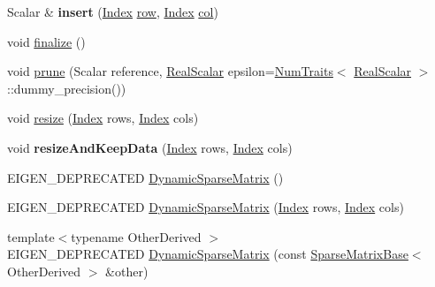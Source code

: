 \begin{DoxyCompactItemize}
\item 
\mbox{\label{class_eigen_1_1_dynamic_sparse_matrix_a4b80127847b5114a9386315f9eca74ed}} 
Scalar \& {\bfseries insert} (\hyperlink{group___core___module_a554f30542cc2316add4b1ea0a492ff02}{Index} \hyperlink{group___sparse_core___module_ac0a5563ed3f243f013fb9d2c17e230d0}{row}, \hyperlink{group___core___module_a554f30542cc2316add4b1ea0a492ff02}{Index} \hyperlink{group___sparse_core___module_a8f4eaa3c3921ef3823ffc69ebcc356af}{col})
\item 
void \hyperlink{class_eigen_1_1_dynamic_sparse_matrix_aa0abc0e4565143f103f0d7373bd4a125}{finalize} ()
\item 
void \hyperlink{class_eigen_1_1_dynamic_sparse_matrix_af3b38485a69d03e5c53d9ba57f9ce1d0}{prune} (Scalar reference, \hyperlink{group___sparse_core___module_aaec8ace6efb785c81d442931c3248d88}{Real\+Scalar} epsilon=\hyperlink{group___core___module_struct_eigen_1_1_num_traits}{Num\+Traits}$<$ \hyperlink{group___sparse_core___module_aaec8ace6efb785c81d442931c3248d88}{Real\+Scalar} $>$\+::dummy\+\_\+precision())
\item 
void \hyperlink{class_eigen_1_1_dynamic_sparse_matrix_a2d793e836fdb4bf0a85c9cf390e07861}{resize} (\hyperlink{group___core___module_a554f30542cc2316add4b1ea0a492ff02}{Index} rows, \hyperlink{group___core___module_a554f30542cc2316add4b1ea0a492ff02}{Index} cols)
\item 
\mbox{\label{class_eigen_1_1_dynamic_sparse_matrix_a6ec61a8f36ee0e3474ed33d70eb51d1b}} 
void {\bfseries resize\+And\+Keep\+Data} (\hyperlink{group___core___module_a554f30542cc2316add4b1ea0a492ff02}{Index} rows, \hyperlink{group___core___module_a554f30542cc2316add4b1ea0a492ff02}{Index} cols)
\item 
E\+I\+G\+E\+N\+\_\+\+D\+E\+P\+R\+E\+C\+A\+T\+ED \hyperlink{class_eigen_1_1_dynamic_sparse_matrix_a46a6947fcf115e6b7b731a8e01e7995d}{Dynamic\+Sparse\+Matrix} ()
\item 
E\+I\+G\+E\+N\+\_\+\+D\+E\+P\+R\+E\+C\+A\+T\+ED \hyperlink{class_eigen_1_1_dynamic_sparse_matrix_ad1c810ff3cfcc97db704d26b9d114f94}{Dynamic\+Sparse\+Matrix} (\hyperlink{group___core___module_a554f30542cc2316add4b1ea0a492ff02}{Index} rows, \hyperlink{group___core___module_a554f30542cc2316add4b1ea0a492ff02}{Index} cols)
\item 
{\footnotesize template$<$typename Other\+Derived $>$ }\\E\+I\+G\+E\+N\+\_\+\+D\+E\+P\+R\+E\+C\+A\+T\+ED \hyperlink{class_eigen_1_1_dynamic_sparse_matrix_ab5bd886d79beb30802df0b1508727482}{Dynamic\+Sparse\+Matrix} (const \hyperlink{group___sparse_core___module_class_eigen_1_1_sparse_matrix_base}{Sparse\+Matrix\+Base}$<$ Other\+Derived $>$ \&other)

\end{DoxyCompactItemize}
